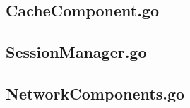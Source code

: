\begin{appendices}
\subsection{CacheComponent.go}
\label{sec:CacheComponent.go}


\subsection{SessionManager.go}
\label{sec:SessionManager.go}


\subsection{NetworkComponents.go}
\label{sec:NetworkComponents.go}


\end{appendices}



